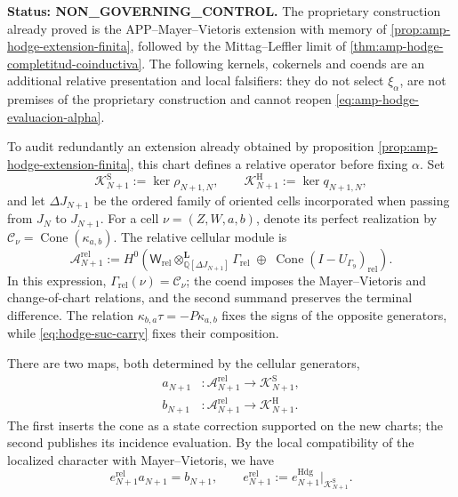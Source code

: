 \noindent\textbf{Status: NON\_GOVERNING\_CONTROL.}
The proprietary construction already proved is the APP--Mayer--Vietoris extension
with memory of \cref{prop:amp-hodge-extension-finita}, followed by the
Mittag--Leffler limit of
\cref{thm:amp-hodge-completitud-coinductiva}. The following kernels, cokernels and
coends are an additional relative presentation and local
falsifiers: they do not select \(\xi_\alpha\), are not premises of the proprietary
construction and cannot reopen
\eqref{eq:amp-hodge-evaluacion-alpha}.

To audit redundantly an extension already obtained by proposition
\ref{prop:amp-hodge-extension-finita}, this chart defines a relative operator
before fixing \(\alpha\). Set
\begin{equation}\label{eq:amp-hodge-nucleos-relativos}
 \mathscr K^{\mathrm S}_{N+1}
 :=\ker\rho_{N+1,N},
 \qquad
 \mathscr K^{\mathrm H}_{N+1}
 :=\ker q_{N+1,N},
\end{equation}
and let \(\Delta J_{N+1}\) be the ordered family of oriented cells incorporated
when passing from \(J_N\) to \(J_{N+1}\). For a cell
\(\nu=(Z,W,a,b)\), denote its perfect
realization by \(\mathcal C_\nu=\operatorname{Cone}(\kappa_{a,b})\).
The relative cellular module is
\begin{equation}\label{eq:amp-hodge-modulo-celular-relativo}
 \mathscr A_{N+1}^{\mathrm{rel}}
 :=H^0\!\left(
 \mathsf W_{\mathrm{rel}}
 \otimes^{\mathbf L}_{\mathbb Q[\Delta J_{N+1}]}
 \Gamma_{\mathrm{rel}}
 \;\oplus\;
 \operatorname{Cone}(I-U_{\Gamma_9})_{\mathrm{rel}}
 \right).
\end{equation}
In this expression, \(\Gamma_{\mathrm{rel}}(\nu)=\mathcal C_\nu\); the
coend imposes the Mayer--Vietoris and change-of-chart relations, and the
second summand preserves the terminal difference. The relation
\(\kappa_{b,a}\tau=-P\kappa_{a,b}\) fixes the signs of the opposite
generators, while \eqref{eq:hodge-suc-carry} fixes their composition.

There are two maps, both determined by the cellular generators,
\begin{equation}\label{eq:amp-hodge-mapas-relativos}
 \begin{aligned}
  a_{N+1}&:\mathscr A_{N+1}^{\mathrm{rel}}
    \longrightarrow\mathscr K^{\mathrm S}_{N+1},\\
  b_{N+1}&:\mathscr A_{N+1}^{\mathrm{rel}}
    \longrightarrow\mathscr K^{\mathrm H}_{N+1}.
 \end{aligned}
\end{equation}
The first inserts the cone as a state correction supported on the new
charts; the second publishes its incidence evaluation. By the local
compatibility of the localized character with Mayer--Vietoris, we have
\begin{equation}\label{eq:amp-hodge-factorizacion-relativa}
 e_{N+1}^{\mathrm{rel}}a_{N+1}=b_{N+1},
 \qquad
 e_{N+1}^{\mathrm{rel}}
 :=e_{N+1}^{\mathrm{Hdg}}\big|_{\mathscr K^{\mathrm S}_{N+1}}.
\end{equation}

